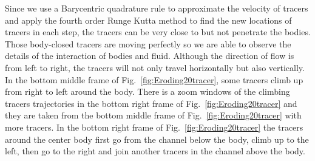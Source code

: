 \documentclass[preprint, 10pt]{elsarticle}
\begin{document}
{Since we use a Barycentric quadrature rule to approximate the velocity
of tracers and apply the fourth order Runge Kutta method to find the new
locations of tracers in each step, the tracers can be very close to but
not penetrate the bodies.  Those body-closed tracers are moving
perfectly so we are able to observe the details of the interaction of
bodies and fluid.  Although the direction of flow is from left to right,
the tracers will not only travel horizontally but also vertically.  In
the bottom middle frame of Fig.~\ref{fig:Eroding20tracer}, some tracers
climb up from right to left around the body.  There is a zoom windows of
the climbing tracers trajectories in the bottom right frame of Fig.~\ref{fig:Eroding20tracer} and
they are taken from the bottom middle frame of
Fig.~\ref{fig:Eroding20tracer} with more tracers.  In the bottom right frame of 
Fig.~\ref{fig:Eroding20tracer} the tracers around the center body first go
from the channel below the body, climb up to the left, then go to the
right and join another tracers in the channel above the body. 
}
\end{document}
